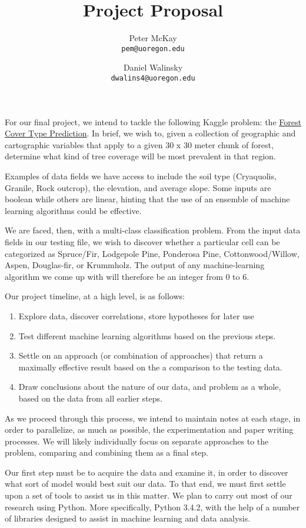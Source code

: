 \documentclass[12pt,a4paper]{article}
\author{
  Peter McKay\\
  \texttt{pem@uoregon.edu}
  \and
  Daniel Walinsky\\
  \texttt{dwalins4@uoregon.edu}
}
\title{Project Proposal}
\begin{document}
\maketitle

For our final project, we intend to tackle the following Kaggle problem:
the 
\href{http://www.kaggle.com/c/forest-cover-type-prediction}{Forest Cover Type Prediction}.
In brief, we wish to, given a collection of geographic and cartographic 
variables that apply to a given 30 x 30 meter chunk of forest, determine 
what kind of tree coverage will be most prevalent in that region.

Examples of data fields we have access to include the soil type 
(Cryaquolis, Granile, Rock outcrop), the elevation, and average slope.
Some inputs are boolean while others are linear, hinting that the use
of an ensemble of machine learning algorithms could be effective.

We are faced, then, with a multi-class classification problem. From the input 
data fields in our testing file, we wish to discover whether a 
particular cell can be categorized as
Spruce/Fir,
Lodgepole Pine,
Ponderosa Pine,
Cottonwood/Willow,
Aspen,
Douglas-fir, or
Krummholz.
The output of any machine-learning algorithm we come up with will therefore be an integer from 0 to 6.

Our project timeline, at a high level, is as follows:
\begin{enumerate}
\item Explore data, discover correlations, store hypotheses for later 
  use
\item Test different machine learning algorithms based on the previous 
  steps.
\item Settle on an approach (or combination of approaches) that return 
  a maximally effective result based on the a comparison to the testing 
  data.
\item Draw conclusions about the nature of our data, and problem as a 
  whole, based on the data from all earlier steps.
\end{enumerate}

As we proceed through this process, we intend to maintain notes at each 
stage, in order to parallelize, as much as possible, the experimentation 
and paper writing processes. We will likely individually focus on separate approaches
to the problem, comparing and combining them as a final step.



Our first step must be to acquire the data and examine it, in order to 
discover what sort of model would best suit our data.  To that end, we 
must first settle upon a set of tools to assist us in this matter.  
We plan to carry out most of our research using Python.  More 
specifically, Python 3.4.2, with the help of a number of libraries designed 
to assist in machine learning and data analysis.  
\end{document}
